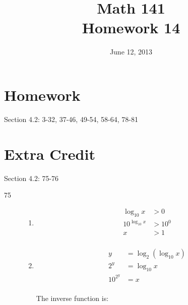 \documentclass{exam}
\date{June 12, 2013}
\author{}
\title{Math 141 \\ Homework 14}
\begin{document}
  \maketitle

  \section{Homework}

  Section 4.2: 3-32, 37-46, 49-54, 58-64, 78-81

 \section{Extra Credit}
  Section 4.2: 75-76

  \ifprintanswers
    \begin{description}
      \item[75]
        \begin{enumerate}[a]

          \item 
            \begin{align*}
              \log_{10} x      & > 0 \\
              10^{\log_{10} x} & > 10^0 \\
              x                & > 1 \\
            \end{align*}


          \item 
            \begin{align*}
              y        &= \log_2 (\log_{10} x) \\
              2^y      &= \log_{10} x \\
              10^{2^y} &= x \\
            \end{align*}

            The inverse function is: 



\end{enumerate}
\end{description}
\end{document}
